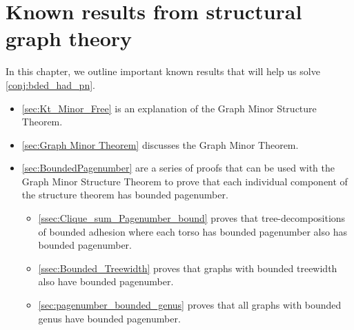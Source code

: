 
\chapter{Known results from structural graph theory}\label{chap:Known results}
In this chapter, we outline important known results that will help us solve \cref{conj:bded_had_pn}.

\begin{itemize}
	\item \cref{sec:Kt_Minor_Free} is an explanation of the Graph Minor Structure Theorem.
	\item \cref{sec:Graph Minor Theorem} discusses the Graph Minor Theorem. 
	\item \cref{sec:BoundedPagenumber} are a series of proofs that can be used with the Graph Minor Structure Theorem to prove that each individual component of the structure theorem has bounded pagenumber.
	\begin{itemize}
		\item \cref{ssec:Clique_sum_Pagenumber_bound} proves that tree-decompositions of bounded adhesion where each torso has bounded pagenumber also has bounded pagenumber.
		\item \cref{ssec:Bounded_Treewidth} proves that graphs with bounded treewidth also have bounded pagenumber.
		\item \cref{sec:pagenumber_bounded_genus} proves that all graphs with bounded genus have bounded pagenumber.
	\end{itemize}
\end{itemize}


